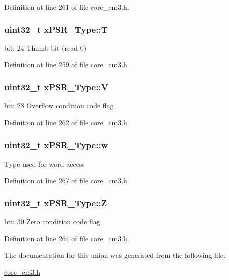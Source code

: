 Definition at line 261 of file core\+\_\+cm3.\+h.

\subsubsection[{\texorpdfstring{T}{T}}]{\setlength{\rightskip}{0pt plus 5cm}uint32\+\_\+t x\+P\+S\+R\+\_\+\+Type\+::T}\hypertarget{unionxPSR__Type_a7eed9fe24ae8d354cd76ae1c1110a658}{}\label{unionxPSR__Type_a7eed9fe24ae8d354cd76ae1c1110a658}
bit\+: 24 Thumb bit (read 0) 

Definition at line 259 of file core\+\_\+cm3.\+h.

\subsubsection[{\texorpdfstring{V}{V}}]{\setlength{\rightskip}{0pt plus 5cm}uint32\+\_\+t x\+P\+S\+R\+\_\+\+Type\+::V}\hypertarget{unionxPSR__Type_af14df16ea0690070c45b95f2116b7a0a}{}\label{unionxPSR__Type_af14df16ea0690070c45b95f2116b7a0a}
bit\+: 28 Overflow condition code flag 

Definition at line 262 of file core\+\_\+cm3.\+h.

\subsubsection[{\texorpdfstring{w}{w}}]{\setlength{\rightskip}{0pt plus 5cm}uint32\+\_\+t x\+P\+S\+R\+\_\+\+Type\+::w}\hypertarget{unionxPSR__Type_a1a47176768f45f79076c4f5b1b534bc2}{}\label{unionxPSR__Type_a1a47176768f45f79076c4f5b1b534bc2}
Type used for word access 

Definition at line 267 of file core\+\_\+cm3.\+h.

\subsubsection[{\texorpdfstring{Z}{Z}}]{\setlength{\rightskip}{0pt plus 5cm}uint32\+\_\+t x\+P\+S\+R\+\_\+\+Type\+::Z}\hypertarget{unionxPSR__Type_a1e5d9801013d5146f2e02d9b7b3da562}{}\label{unionxPSR__Type_a1e5d9801013d5146f2e02d9b7b3da562}
bit\+: 30 Zero condition code flag 

Definition at line 264 of file core\+\_\+cm3.\+h.



The documentation for this union was generated from the following file\+:\begin{DoxyCompactItemize}
\item 
\hyperlink{core__cm3_8h}{core\+\_\+cm3.\+h}\end{DoxyCompactItemize}
